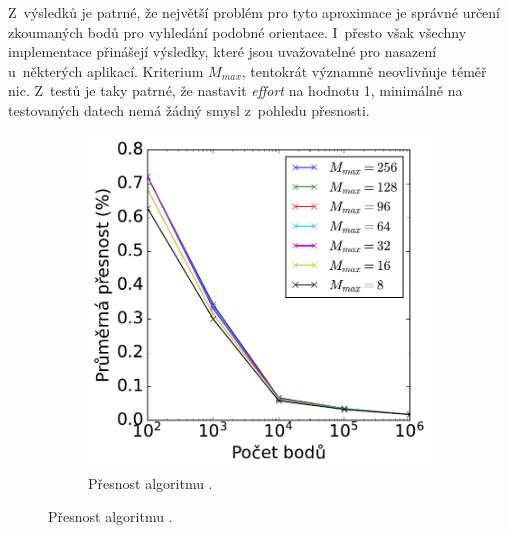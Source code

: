 Z~výsledků je patrné, že největší problém pro tyto aproximace je správné určení zkoumaných bodů pro vyhledání podobné orientace. I~přesto však všechny implementace přinášejí výsledky, které jsou uvažovatelné pro nasazení u~některých aplikací. Kriterium $M_{max}$, tentokrát významně neovlivňuje téměř nic. Z~testů je taky patrné, že nastavit \emph{effort} na hodnotu 1, minimálně na testovaných datech nemá žádný smysl z~pohledu přesnosti. 



\begin{figure}
 
\begin{subfigure}[t]{0.49\columnwidth}
    \centering  
    \includegraphics[scale=0.6]{obrazky-figures/benchmark/accuracy/normal/acccurucy_first_err_cases.pdf}
    \caption{Přesnost algoritmu .}


\end{subfigure}
\end{figure}
